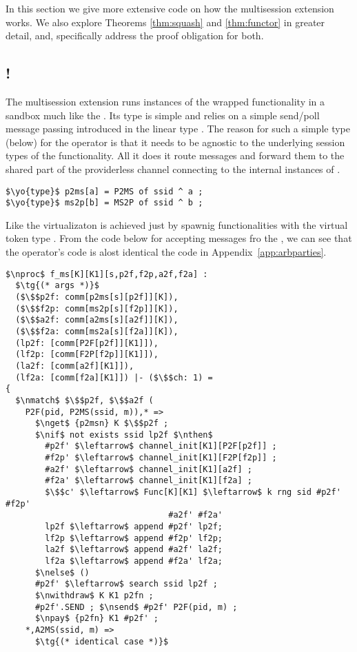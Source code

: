 In this section we give more extensive code on how the multisession extension works. 
We also explore Theorems \ref{thm:squash} and \ref{thm:functor} in greater detail, and, specifically address the proof obligation for both.

\subsection{!\F}
The multisession extension runs instances of the wrapped functionality in a sandbox much like the \partywrapper.
Its type is simple and relies on a simple send/poll message passing introduced in the linear type .
The reason for such a simple type (below) for the operator is that it needs to be agnostic to the underlying session types 
of the functionality. All it does it route messages and forward them to the shared part of the providerless channel
connecting to the internal instances of \F.

\begin{lstlisting}[basicstyle=\small\BeraMonottFamily, mathescape]
$\yo{type}$ p2ms[a] = P2MS of ssid ^ a ;
$\yo{type}$ ms2p[b] = MS2P of ssid ^ b ;
\end{lstlisting}

Like the \partywrapper virtualizaton is achieved just by spawnig functionalities with the virtual token type .
From the code below for accepting messages fro the \partywrapper, we can see that the operator's code is alost identical the code in Appendix~\ref{app:arbparties}.
\begin{lstlisting}[basicstyle=\footnotesize\BeraMonottFamily, frame=single, mathescape]
$\nproc$ f_ms[K][K1][s,p2f,f2p,a2f,f2a] :
  $\tg{(* args *)}$
  ($\$$p2f: comm[p2ms[s][p2f]][K]), 
  ($\$$f2p: comm[ms2p[s][f2p]][K]),
  ($\$$a2f: comm[a2ms[s][a2f]][K]), 
  ($\$$f2a: comm[ms2a[s][f2a]][K]),
  (lp2f: [comm[P2F[p2f]][K1]]), 
  (lf2p: [comm[F2P[f2p]][K1]]),
  (la2f: [comm[a2f][K1]]), 
  (lf2a: [comm[f2a][K1]]) |- ($\$$ch: 1) =
{
  $\nmatch$ $\$$p2f, $\$$a2f (
    P2F(pid, P2MS(ssid, m)),* =>
      $\nget$ {p2msn} K $\$$p2f ;
      $\nif$ not exists ssid lp2f $\nthen$
        #p2f' $\leftarrow$ channel_init[K1][P2F[p2f]] ;
        #f2p' $\leftarrow$ channel_init[K1][F2P[f2p]] ;
        #a2f' $\leftarrow$ channel_init[K1][a2f] ;
        #f2a' $\leftarrow$ channel_init[K1][f2a] ;
        $\$$c' $\leftarrow$ Func[K][K1] $\leftarrow$ k rng sid #p2f' #f2p' 
                                 #a2f' #f2a'
        lp2f $\leftarrow$ append #p2f' lp2f; 
        lf2p $\leftarrow$ append #f2p' lf2p;
        la2f $\leftarrow$ append #a2f' la2f; 
        lf2a $\leftarrow$ append #f2a' lf2a;
      $\nelse$ ()
      #p2f' $\leftarrow$ search ssid lp2f ;
      $\nwithdraw$ K K1 p2fn ;
      #p2f'.SEND ; $\nsend$ #p2f' P2F(pid, m) ; 
      $\npay$ {p2fn} K1 #p2f' ;
    *,A2MS(ssid, m) => 
      $\tg{(* identical case *)}$
\end{lstlisting}

